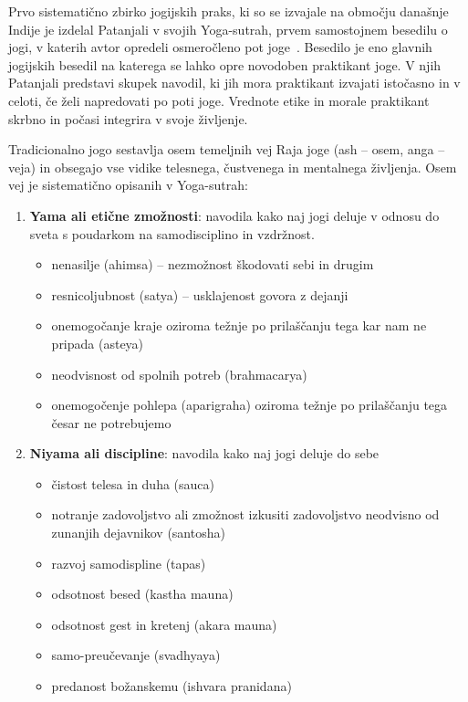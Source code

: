 \documentclass[a4paper, 12pt]{book}
\begin{document}
Prvo sistematično zbirko jogijskih praks, ki so se izvajale na območju današnje Indije je izdelal Patanjali v svojih Yoga-sutrah, prvem samostojnem besedilu o jogi, v katerih avtor opredeli osmeročleno pot joge~\cite{ZgodovinaJoge}. Besedilo je eno glavnih jogijskih besedil na katerega se lahko opre novodoben praktikant joge. V njih Patanjali predstavi skupek navodil, ki jih mora praktikant izvajati istočasno in v celoti, če želi napredovati po poti joge. Vrednote etike in morale praktikant skrbno in počasi integrira v svoje življenje.

Tradicionalno jogo sestavlja osem temeljnih vej Raja joge (ash – osem, anga – veja) in obsegajo vse vidike telesnega, čustvenega in mentalnega življenja. Osem vej je sistematično opisanih v Yoga-sutrah:

\begin{enumerate}
	\item \textbf{Yama ali etične zmožnosti}: navodila kako naj jogi deluje v odnosu do sveta s poudarkom na samodisciplino in vzdržnost.
		\begin{itemize}
			\item nenasilje (ahimsa) – nezmožnost škodovati sebi in drugim
			\item resnicoljubnost (satya) – usklajenost govora z dejanji
			\item onemogočanje kraje oziroma težnje po prilaščanju tega kar nam ne pripada (asteya)
			\item neodvisnost od spolnih potreb (brahmacarya)
			\item onemogočenje pohlepa (aparigraha) oziroma težnje po prilaščanju tega česar ne potrebujemo
		\end{itemize}
	
	\item \textbf{Niyama ali discipline}: navodila kako naj jogi deluje do sebe
		\begin{itemize}
			\item čistost telesa in duha (sauca)
			\item notranje zadovoljstvo ali zmožnost izkusiti zadovoljstvo neodvisno od zunanjih dejavnikov (santosha)
			\item razvoj samodispline (tapas)
			\item odsotnost besed (kastha mauna)
			\item odsotnost gest in kretenj (akara mauna)
			\item samo-preučevanje (svadhyaya)
			\item predanost božanskemu (ishvara pranidana)
		\end{itemize}


\end{enumerate}
\end{document}
